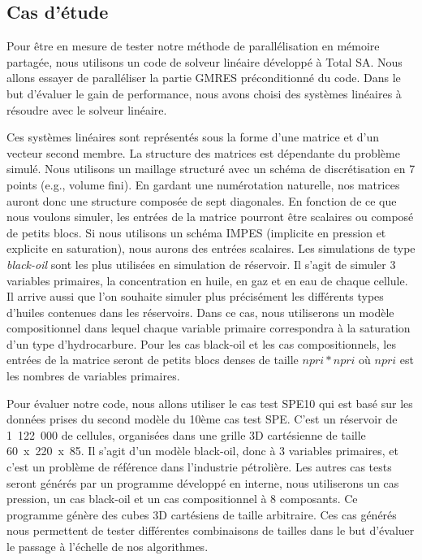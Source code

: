 \subsection{Cas d'étude}
Pour être en mesure de tester notre méthode de parallélisation en mémoire partagée, nous utilisons un code de solveur linéaire développé à Total SA.
%
Nous allons essayer de paralléliser la partie GMRES préconditionné du code.
%
Dans le but d'évaluer le gain de performance, nous avons choisi des systèmes linéaires à résoudre avec le solveur linéaire.


Ces systèmes linéaires sont représentés sous la forme d'une matrice et d'un vecteur second membre.
%
La structure des matrices est dépendante du problème simulé.
%
Nous utilisons un maillage structuré avec un schéma de discrétisation en 7 points (e.g., volume fini).
%
En gardant une numérotation naturelle, nos matrices auront donc une structure composée de sept diagonales.
%
En fonction de ce que nous voulons simuler, les entrées de la matrice pourront être scalaires ou composé de petits blocs.
%
Si nous utilisons un schéma IMPES (implicite en pression et explicite en saturation), nous aurons des entrées scalaires.
%
Les simulations de type {\em black-oil} sont les plus utilisées en simulation de réservoir.
%
Il s'agit de simuler 3 variables primaires, la concentration en huile, en gaz et en eau de chaque cellule.
%
Il arrive aussi que l'on souhaite simuler plus précisément les différents types d'huiles contenues dans les réservoirs.
%
Dans ce cas, nous utiliserons un modèle compositionnel dans lequel chaque variable primaire correspondra à la saturation d'un type d'hydrocarbure.
%
Pour les cas black-oil et les cas compositionnels, les entrées de la matrice seront de petits blocs denses de taille $npri*npri$ où $npri$ est les nombres de variables primaires.

Pour évaluer notre code, nous allons utiliser le cas test SPE10 qui est basé sur les données prises du second modèle du 10ème cas test SPE\cite{SPE10}.
%
C'est un réservoir de 1~122~000 de cellules, organisées dans une grille 3D cartésienne de taille 60~x~220~x~85.
%
Il s'agit d'un modèle black-oil, donc à 3 variables primaires, et c'est un problème de référence dans l'industrie pétrolière.
%
Les autres cas tests seront générés par un programme développé en interne, nous utiliserons un cas pression, un cas black-oil et un cas compositionnel à 8 composants.
%
Ce programme génère des cubes 3D cartésiens de taille arbitraire.
%
Ces cas générés nous permettent de tester différentes combinaisons de tailles dans le but d'évaluer le passage à l'échelle de nos algorithmes.

